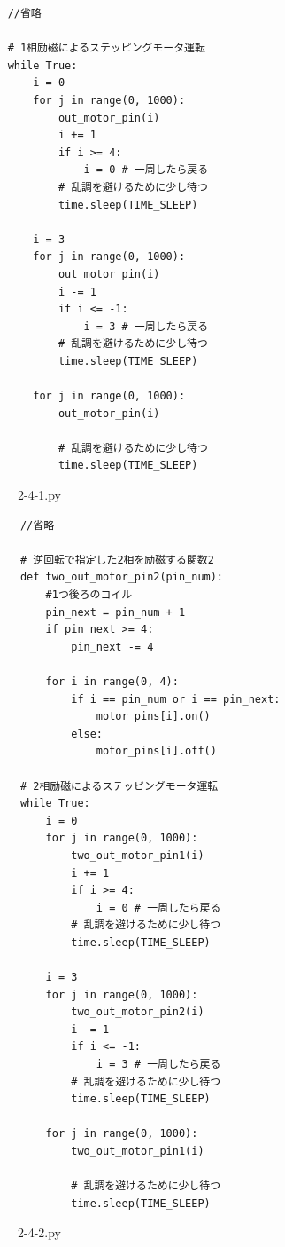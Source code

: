 \documentclass{ltjsarticle} %
\begin{document}
\begin{mdframed}
  \begin{verbatim}
    //省略

    # 1相励磁によるステッピングモータ運転
    while True:
        i = 0
        for j in range(0, 1000):   
            out_motor_pin(i)
            i += 1
            if i >= 4:
                i = 0 # ⼀周したら戻る
            # 乱調を避けるために少し待つ
            time.sleep(TIME_SLEEP)

        i = 3
        for j in range(0, 1000):   
            out_motor_pin(i)
            i -= 1
            if i <= -1:
                i = 3 # ⼀周したら戻る
            # 乱調を避けるために少し待つ
            time.sleep(TIME_SLEEP)

        for j in range(0, 1000):   
            out_motor_pin(i)

            # 乱調を避けるために少し待つ
            time.sleep(TIME_SLEEP) 	
  \end{verbatim}
  \end{mdframed}
  \begin{figure}[H]
  \caption{2-4-1.py}
  \label{fig:2-4-1py}
  \end{figure}



\begin{mdframed}
    \begin{verbatim}
      //省略
  
      # 逆回転で指定した2相を励磁する関数2
      def two_out_motor_pin2(pin_num):
          #1つ後ろのコイル
          pin_next = pin_num + 1
          if pin_next >= 4:
              pin_next -= 4
        
          for i in range(0, 4):
              if i == pin_num or i == pin_next:
                  motor_pins[i].on()
              else:
                  motor_pins[i].off()
            
      # 2相励磁によるステッピングモータ運転
      while True:
          i = 0
          for j in range(0, 1000):   
              two_out_motor_pin1(i)
              i += 1
              if i >= 4:
                  i = 0 # ⼀周したら戻る
              # 乱調を避けるために少し待つ
              time.sleep(TIME_SLEEP)
      
          i = 3
          for j in range(0, 1000):   
              two_out_motor_pin2(i)
              i -= 1
              if i <= -1:
                  i = 3 # ⼀周したら戻る
              # 乱調を避けるために少し待つ
              time.sleep(TIME_SLEEP)
      
          for j in range(0, 1000):   
              two_out_motor_pin1(i)
      
              # 乱調を避けるために少し待つ
              time.sleep(TIME_SLEEP) 	
    \end{verbatim}
    \end{mdframed}
    \begin{figure}[H]
    \caption{2-4-2.py}
    \label{fig:2-4-2py}
    \end{figure}
\end{document}

